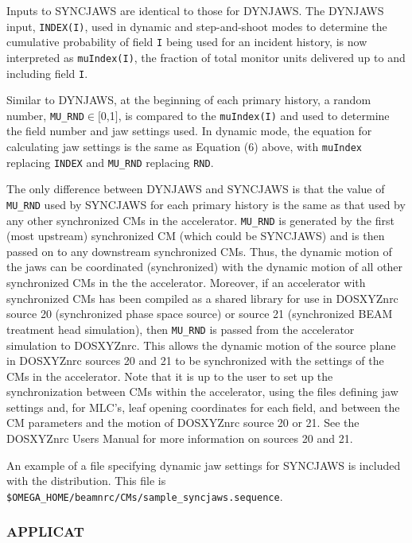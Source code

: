 \documentclass[12pt,twoside]{article}
\begin{document}
Inputs to SYNCJAWS are identical to those for DYNJAWS.  The DYNJAWS input, {\tt INDEX(I)}, used in dynamic
and step-and-shoot modes to determine the cumulative probability of field {\tt I} being used for
an incident history, is now interpreted as {\tt muIndex(I)}, the fraction of total monitor units
delivered up to and including field {\tt I}.

Similar to DYNJAWS, at the beginning of each primary history, a random number, {\tt MU\_RND}$\in[$0,1$]$, is
compared to the {\tt muIndex(I)} and used to determine the field number and jaw settings used.  In dynamic mode,
the equation for calculating jaw settings is the same as Equation (6) above, with {\tt muIndex} replacing
{\tt INDEX} and {\tt MU\_RND} replacing {\tt RND}.

The only difference between
DYNJAWS and SYNCJAWS is that the value of {\tt MU\_RND} used by SYNCJAWS for each primary history is the same as
that used by any other synchronized CMs in the accelerator.  {\tt MU\_RND} is generated by the first (most upstream) synchronized
CM (which could be SYNCJAWS) and is then passed on to any downstream synchronized CMs.
Thus, the dynamic motion of the jaws can be coordinated (synchronized) with the dynamic motion of all other synchronized CMs
in the the accelerator.  Moreover, if an accelerator with synchronized CMs has been compiled as a shared library for use
in DOSXYZnrc source 20
(synchronized phase space source) or source 21 (synchronized BEAM treatment head simulation), then {\tt MU\_RND} is passed from the
accelerator simulation to DOSXYZnrc.  This allows the dynamic motion of the source plane in DOSXYZnrc sources 20 and 21 to be synchronized with
the settings of the CMs in the accelerator.
Note that it is up to the user to set up the synchronization between CMs within the accelerator, using the files defining jaw
settings and, for MLC's, leaf opening coordinates for each field, and between the CM parameters and the motion of
DOSXYZnrc source 20 or 21.
See the DOSXYZnrc Users Manual\cite{Wa05} for more information on sources 20 and 21.

An example of a file specifying dynamic jaw settings for SYNCJAWS
is included with the distribution.  This file is {\tt \$OMEGA\_HOME/beamnrc/CMs/sample\_syncjaws.sequence}.

\clearpage
\vspace*{-1cm}
\subsubsection{APPLICAT}
\renewcommand{\rightmark}{APPLICAT CM}
\end{document}
